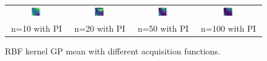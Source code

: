 \documentclass[11pt]{article}
\begin{document}
\begin{figure}[H]
\begin{tabular}{cccc}
        \includegraphics[width=0.225\textwidth]{../Task-02/plots/gp_mean_rbf_n10_PI.png} &
        \includegraphics[width=0.225\textwidth]{../Task-02/plots/gp_mean_rbf_n20_PI.png} &
        \includegraphics[width=0.225\textwidth]{../Task-02/plots/gp_mean_rbf_n50_PI.png} &
        \includegraphics[width=0.225\textwidth]{../Task-02/plots/gp_mean_rbf_n100_PI.png} \\
        n=10 with PI & n=20 with PI & n=50 with PI & n=100 with PI \\
    \end{tabular}
    \caption{RBF kernel GP mean with different acquisition functions.}
    \label{fig:rbf_gp_mean}
\end{figure}
\end{document}
